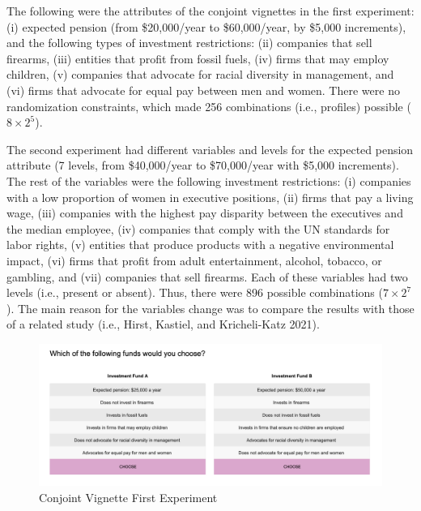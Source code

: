 \documentclass[
  12pt,
]{article}
\begin{document}
The following were the attributes of the conjoint vignettes in the first experiment: (i) expected pension (from \$20,000/year to \$60,000/year, by \$5,000 increments), and the following types of investment restrictions: (ii) companies that sell firearms, (iii) entities that profit from fossil fuels, (iv) firms that may employ children, (v) companies that advocate for racial diversity in management, and (vi) firms that advocate for equal pay between men and women. There were no randomization constraints, which made 256 combinations (i.e., profiles) possible (\(8 \times 2^5\)).

The second experiment had different variables and levels for the expected pension attribute (7 levels, from \$40,000/year to \$70,000/year with \$5,000 increments). The rest of the variables were the following investment restrictions: (i) companies with a low proportion of women in executive positions, (ii) firms that pay a living wage, (iii) companies with the highest pay disparity between the executives and the median employee, (iv) companies that comply with the UN standards for labor rights, (v) entities that produce products with a negative environmental impact, (vi) firms that profit from adult entertainment, alcohol, tobacco, or gambling, and (vii) companies that sell firearms. Each of these variables had two levels (i.e., present or absent). Thus, there were 896 possible combinations (\(7 \times 2^7\)). The main reason for the variables change was to compare the results with those of a related study (i.e., Hirst, Kastiel, and Kricheli-Katz 2021).

\begin{figure}

{\centering \includegraphics{cj1} 

}

\caption{Conjoint Vignette First Experiment}\label{fig:cj1}
\end{figure}
\end{document}
